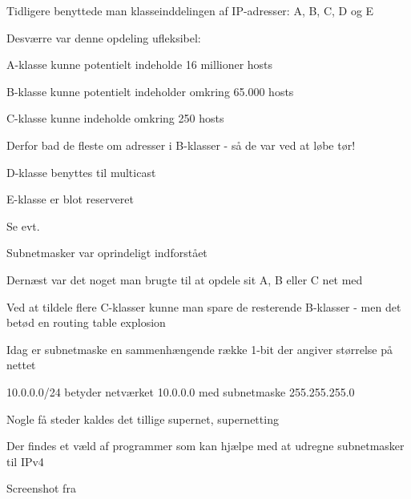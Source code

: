 \begin{list1}
\item Tidligere benyttede man klasseinddelingen af IP-adresser: A, B, C, D og E
\item Desværre var denne opdeling ufleksibel:
\begin{list2}
\item A-klasse kunne potentielt indeholde 16 millioner hosts
\item B-klasse kunne potentielt indeholder omkring 65.000 hosts
\item C-klasse kunne indeholde omkring 250 hosts
\end{list2}
\item Derfor bad de fleste om adresser i B-klasser - så de var ved at løbe tør!
\item D-klasse benyttes til multicast
\item E-klasse er blot reserveret
\item Se evt. 
\end{list1}




\begin{list1}
\item Subnetmasker var oprindeligt indforstået
\item Dernæst var det noget man brugte til at opdele sit A, B eller C net med
\item Ved at tildele flere C-klasser kunne man spare de resterende B-klasser - men det betød en routing table explosion
\item Idag er subnetmaske en sammenhængende række 1-bit der angiver størrelse på nettet
\item 10.0.0.0/24 betyder netværket 10.0.0.0 med subnetmaske 255.255.255.0
\item Nogle få steder kaldes det tillige supernet, supernetting
\end{list1}




\begin{list1}
\item Der findes et væld af programmer som kan hjælpe med at udregne
subnetmasker til IPv4
\item Screenshot fra 
\end{list1}


